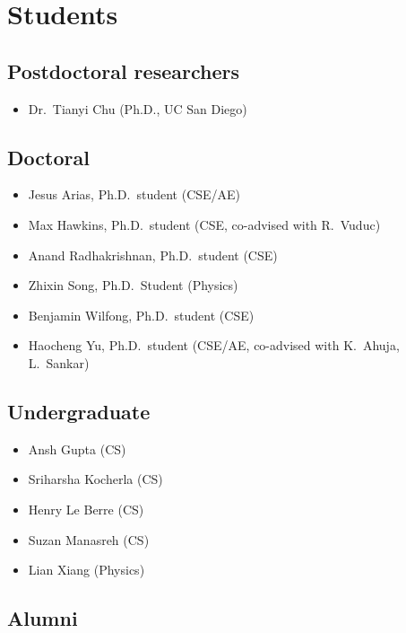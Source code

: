 \section{Students}

\subsection{Postdoctoral researchers}

\begin{itemize}
    \item Dr.\ Tianyi Chu (Ph.D., UC San Diego)
\end{itemize}

\subsection{Doctoral}

\begin{itemize}
    \item Jesus Arias, Ph.D.\ student (CSE/AE)
    \item Max Hawkins, Ph.D.\ student (CSE, co-advised with R.\ Vuduc)
    \item Anand Radhakrishnan, Ph.D.\ student (CSE)
    \item Zhixin Song, Ph.D.\ Student (Physics)
    \item Benjamin Wilfong, Ph.D.\ student (CSE)
    \item Haocheng Yu, Ph.D.\ student (CSE/AE, co-advised with K.\ Ahuja, L.\ Sankar)
\end{itemize}

\subsection{Undergraduate}

\begin{itemize}
    \item Ansh Gupta (CS)
    \item Sriharsha Kocherla (CS)
    \item Henry Le Berre (CS)
    \item Suzan Manasreh (CS)
    \item Lian Xiang (Physics)
\end{itemize}

\subsection{Alumni}

